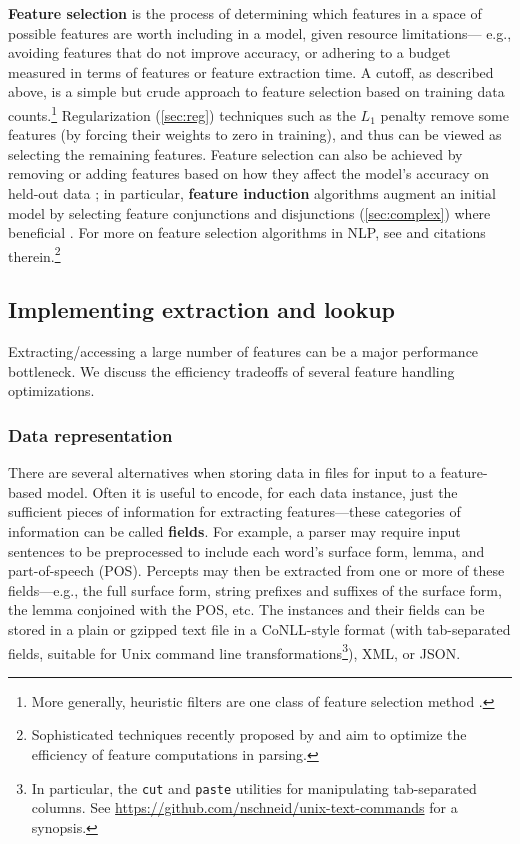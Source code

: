 \documentclass[11pt,letterpaper]{article}
\begin{document}
\textbf{Feature selection} is the process of determining which features in a space of possible features 
are worth including in a model, given resource limitations---%
e.g., avoiding features that do not improve accuracy, or 
adhering to a budget measured in terms of features or feature extraction time.
A cutoff, as described above, is a simple but crude approach to feature selection based on training data counts.\footnote{More generally, 
heuristic filters are one class of feature selection method \citep[slide~13]{martins-tutorial}.}
Regularization (\cref{sec:reg}) techniques such as the $L_1$ penalty 
remove some features (by forcing their weights to zero in training), 
and thus can be viewed as selecting the remaining features.
Feature selection can also be achieved by 
removing or adding features based on how they affect the model's accuracy on held-out data \citep[``wrapper methods'';][slides~16--17]{martins-tutorial};
in particular, \textbf{feature induction} algorithms augment an initial model 
by selecting feature conjunctions and disjunctions (\cref{sec:complex}) where beneficial \citep{della_pietra-97,mccallum-03}.
For more on feature selection algorithms in NLP, see \citet{collins-05} and citations therein.\footnote{Sophisticated 
techniques recently proposed by \citet{he-13} and \citet{weiss-13} aim to optimize 
the efficiency of feature computations in parsing.}

\subsection{Implementing extraction and lookup}

Extracting/accessing a large number of features can be a major performance bottleneck. 
We discuss the efficiency tradeoffs of several feature handling optimizations.

\subsubsection{Data representation}\label{sec:datarep}

There are several alternatives when storing data in files for input to a feature-based model. 
Often it is useful to encode, for each data instance, just the sufficient pieces of information 
for extracting features---these categories of information can be called \textbf{fields}. 
For example, a parser may require input sentences to be preprocessed 
to include each word's surface form, lemma, and part-of-speech (POS). 
Percepts may then be extracted from one or more of these fields---e.g., the full surface form, 
string prefixes and suffixes of the surface form, the lemma conjoined with the POS, etc. 
The instances and their fields can be stored in a plain or gzipped text file 
in a CoNLL-style format (with tab-separated fields, suitable for Unix command line transformations\footnote{In particular, 
the \texttt{cut} and \texttt{paste} utilities for manipulating tab-separated columns. See \url{https://github.com/nschneid/unix-text-commands} for a synopsis.}), 
XML, or JSON.
\end{document}
